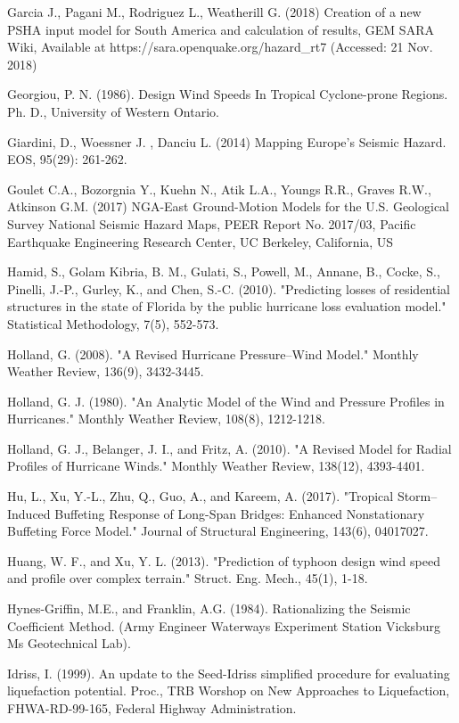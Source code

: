 Garcia J., Pagani M., Rodriguez L., Weatherill G. (2018) Creation of a new PSHA input model for South America and calculation of results, GEM SARA Wiki, Available at https://sara.openquake.org/hazard_rt7 (Accessed: 21 Nov. 2018)

Georgiou, P. N. (1986). Design Wind Speeds In Tropical Cyclone-prone Regions. Ph. D., University of Western Ontario.

Giardini, D., Woessner J. , Danciu L. (2014) Mapping Europe’s Seismic Hazard. EOS, 95(29): 261-262.

Goulet C.A., Bozorgnia Y., Kuehn N., Atik L.A., Youngs R.R., Graves R.W., Atkinson G.M. (2017) NGA-East Ground-Motion Models for the U.S. Geological Survey National Seismic Hazard Maps, PEER Report No. 2017/03, Pacific Earthquake Engineering Research Center, UC Berkeley, California, US

Hamid, S., Golam Kibria, B. M., Gulati, S., Powell, M., Annane, B., Cocke, S., Pinelli, J.-P., Gurley, K., and Chen, S.-C. (2010). "Predicting losses of residential structures in the state of Florida by the public hurricane loss evaluation model." Statistical Methodology, 7(5), 552-573.

Holland, G. (2008). "A Revised Hurricane Pressure–Wind Model." Monthly Weather Review, 136(9), 3432-3445.

Holland, G. J. (1980). "An Analytic Model of the Wind and Pressure Profiles in Hurricanes." Monthly Weather Review, 108(8), 1212-1218.

Holland, G. J., Belanger, J. I., and Fritz, A. (2010). "A Revised Model for Radial Profiles of Hurricane Winds." Monthly Weather Review, 138(12), 4393-4401.

Hu, L., Xu, Y.-L., Zhu, Q., Guo, A., and Kareem, A. (2017). "Tropical Storm–Induced Buffeting Response of Long-Span Bridges: Enhanced Nonstationary Buffeting Force Model." Journal of Structural Engineering, 143(6), 04017027.

Huang, W. F., and Xu, Y. L. (2013). "Prediction of typhoon design wind speed and profile over complex terrain." Struct. Eng. Mech., 45(1), 1-18.

Hynes-Griffin, M.E., and Franklin, A.G. (1984). Rationalizing the Seismic Coefficient Method. (Army Engineer Waterways Experiment Station Vicksburg Ms Geotechnical Lab).

Idriss, I. (1999). An update to the Seed-Idriss simplified procedure for evaluating liquefaction potential. Proc., TRB Worshop on New Approaches to Liquefaction, FHWA-RD-99-165, Federal Highway Administration.

